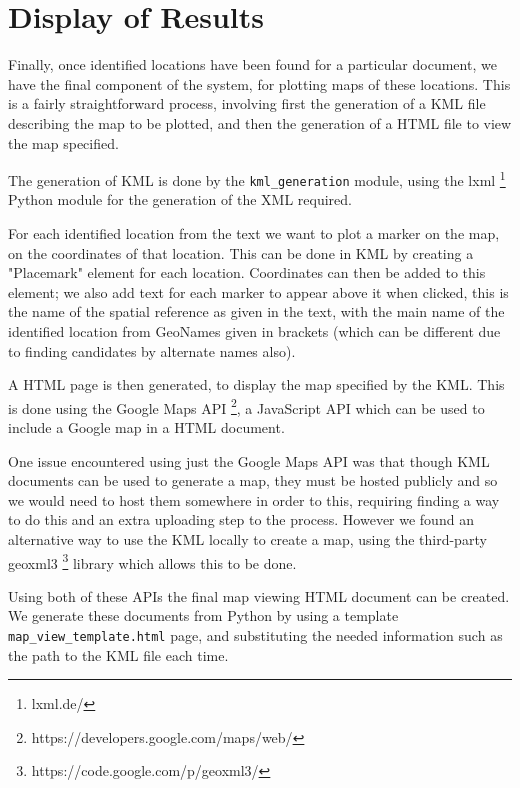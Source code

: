 \documentclass[12pt, a4paper]{report}
\begin{document}
\section{Display of Results}

Finally, once identified locations have been found for a particular document, we have the final component of the system, for plotting maps of these locations. This is a fairly straightforward process, involving first the generation of a KML file describing the map to be plotted, and then the generation of a HTML file to view the map specified.

The generation of KML is done by the \verb#kml_generation# module, using the lxml \footnote{lxml.de/} Python module for the generation of the XML required.

For each identified location from the text we want to plot a marker on the map, on the coordinates of that location. This can be done in KML by creating a "Placemark" element for each location. Coordinates can then be added to this element; we also add text for each marker to appear above it when clicked, this is the name of the spatial reference as given in the text, with the main name of the identified location from GeoNames given in brackets (which can be different due to finding candidates by alternate names also).

A HTML page is then generated, to display the map specified by the KML. This is done using the Google Maps API \footnote{https://developers.google.com/maps/web/}, a JavaScript API which can be used to include a Google map in a HTML document.

One issue encountered using just the Google Maps API was that though KML documents can be used to generate a map, they must be hosted publicly and so we would need to host them somewhere in order to this, requiring finding a way to do this and an extra uploading step to the process. However we found an alternative way to use the KML locally to create a map, using the third-party geoxml3 \footnote{https://code.google.com/p/geoxml3/} library which allows this to be done.

Using both of these APIs the final map viewing HTML document can be created. We generate these documents from Python by using a template \verb#map_view_template.html# page, and substituting the needed information such as the path to the KML file each time.

\end{document}

